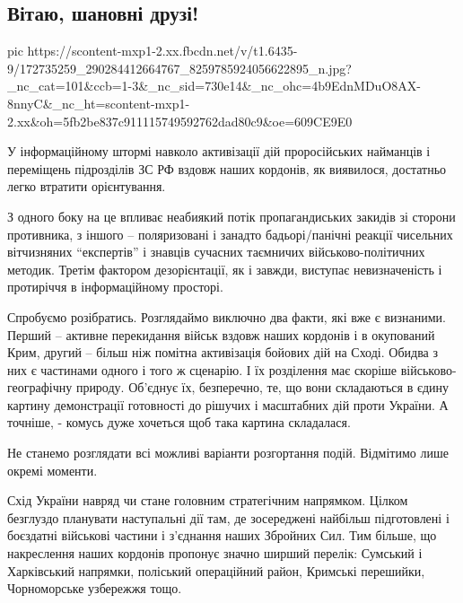  
 
 
 
 

\subsection{Вітаю, шановні друзі!}
\label{sec:12_04_2021.fb.zabrodskij_mihail.1.rossia_ukraina_vojna}

\ifcmt
  pic https://scontent-mxp1-2.xx.fbcdn.net/v/t1.6435-9/172735259_290284412664767_8259785924056622895_n.jpg?_nc_cat=101&ccb=1-3&_nc_sid=730e14&_nc_ohc=4b9EdnMDuO8AX-8nnyC&_nc_ht=scontent-mxp1-2.xx&oh=5fb2be837c911115749592762dad80c9&oe=609CE9E0
\fi

У інформаційному штормі навколо активізації дій проросійських найманців і
переміщень підрозділів ЗС РФ вздовж наших кордонів, як виявилося, достатньо
легко втратити орієнтування.

З одного боку на це впливає неабиякий потік пропагандиських  закидів зі сторони
противника, з іншого – поляризовані і занадто бадьорі/панічні реакції чисельних
вітчизняних “експертів” і знавців сучасних  таємничих військово-політичних
методик. Третім фактором дезорієнтації, як і завжди, виступає невизначеність і
протиріччя в інформаційному просторі.

Спробуємо розібратись. Розглядаймо виключно два факти, які вже є визнаними.
Перший – активне перекидання військ вздовж наших кордонів і в окупований Крим,
другий – більш ніж помітна активізація бойових дій на Сході. Обидва з них є
частинами одного і того ж сценарію. І їх розділення має скоріше
військово-географічну природу. Об’єднує їх, безперечно, те, що вони складаються
в єдину картину демонстрації готовності до рішучих і масштабних дій проти
України. А точніше, - комусь дуже хочеться щоб така картина складалася.

Не станемо розглядати всі можливі варіанти розгортання подій. Відмітимо лише окремі моменти. 

Схід України навряд чи стане головним стратегічним напрямком. Цілком безглуздо
планувати наступальні дії там, де зосереджені найбільш підготовлені і боєздатні
військові частини і з’єднання наших Збройних Сил. Тим більше, що накреслення
наших кордонів пропонує значно ширший перелік: Сумський і Харківський напрямки,
поліський операційний район, Кримські перешийки, Чорноморське узбережжя тощо. 

